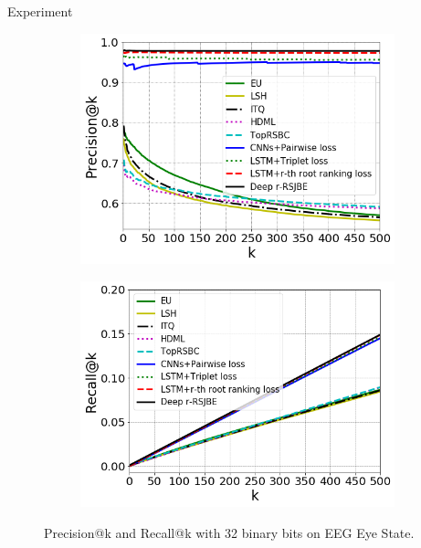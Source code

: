 \documentclass[final]{beamer}
\newlength{\onecolwid}
\begin{document}
\begin{frame}[t]
\begin{columns}[t]
\begin{column}{\onecolwid}
\begin{block}{Experiment}
\begin{figure}\vspace{2mm}
     \begin{subfigure}[t]{0.45\textwidth}
            \includegraphics[width=\textwidth]{fig4a}
            \label{fig:a}
     \end{subfigure}
     \quad
     \begin{subfigure}[t]{0.45\textwidth}
            \includegraphics[width=\textwidth]{fig5a}
            \label{fig:b}
     \end{subfigure}
      \caption{Precision@k and Recall@k with 32 binary bits on EEG Eye State.}\vspace{-5mm}
 \end{figure}
 

\end{block}
\end{column}
\end{columns}
\end{frame}
\end{document}
